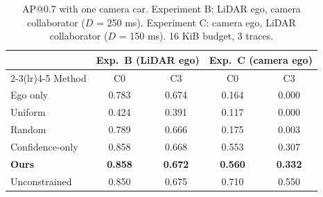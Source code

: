 \begin{table}[t]\caption{AP@0.7 with one camera car. Experiment B: LiDAR ego, camera collaborator ($D$ = 250 ms). Experiment C: camera ego, LiDAR collaborator ($D$ = 150 ms). 16 KiB budget, 3 traces.}\label{tab:camera}
\centering\scriptsize\setlength{\tabcolsep}{4pt}\begin{tabular}{lcccc}\toprule & \multicolumn{2}{c}{Exp.\ B (LiDAR ego)} & \multicolumn{2}{c}{Exp.\ C (camera ego)}\\\cmidrule(lr){2-3}\cmidrule(lr){4-5}
Method & C0 & C3 & C0 & C3\\\midrule
Ego only & 0.783 & 0.674 & 0.164 & 0.000\\
Uniform & 0.424 & 0.391 & 0.117 & 0.000\\
Random & 0.789 & 0.666 & 0.175 & 0.003\\
Confidence-only & 0.858 & 0.668 & 0.553 & 0.307\\
\textbf{Ours} & \textbf{0.858} & \textbf{0.672} & \textbf{0.560} & \textbf{0.332}\\
Unconstrained & 0.850 & 0.675 & 0.710 & 0.550\\
\bottomrule\end{tabular}\end{table}
